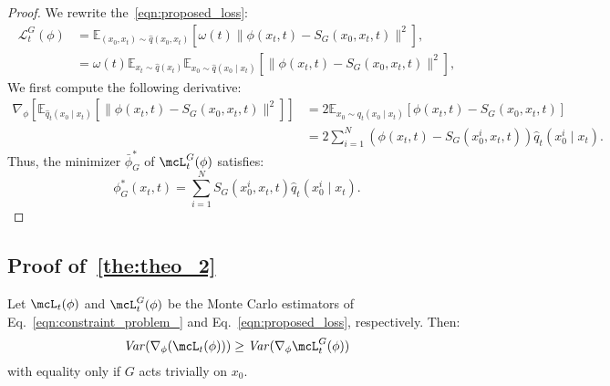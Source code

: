 \begin{proof}
We rewrite the~\cref{eqn:proposed_loss}:
\begin{align}
    \mathcal{L}^G_t(\phi) &= \mathbb{E}_{(x_0, x_t) \sim \hat{q}(x_0, x_t)} \left[ \omega(t) \| \phi(x_t, t) - S_G(x_0, x_t, t) \|^2 \right], \\
    &= \omega(t)\mathbb{E}_{x_t \sim \hat{q}(x_t)}\mathbb{E}_{x_0 \sim \hat{q}(x_0 \mid x_t)} \left[ \| \phi(x_t, t) - S_G(x_0, x_t, t) \|^2 \right],
\end{align}
We first compute the following derivative:
\begin{align}
    \nabla_\phi \left[ \mathbb{E}_{\hat{q}_t(x_0 \mid x_t)} \left[ \| \phi(x_t, t) - S_G(x_0, x_t, t) \|^2 \right] \right] &= 2 \mathbb{E}_{x_0 \sim \hat{q}_t(x_0 \mid x_t)} \left[\phi(x_t, t) - S_G(x_0, x_t, t)  \right] \\
    &= 2 \sum_{i=1}^N (\phi(x_t, t) - S_G(x_0^i, x_t, t)) \hat{q}_t(x_0^i \mid x_t).
\end{align}
Thus, the minimizer \( \bar{\phi}^*_G \) of \(\mcL_t^G(\phi)\) satisfies:
\begin{equation}
    \phi_G^*(x_t, t) = \sum_{i=1}^N S_G(x_0^i, x_t, t) \hat{q}_t(x_0^i \mid x_t). 
\end{equation}






\end{proof}


\subsection{Proof of~\cref{the:theo_2}}
\label{sub_app:theo_2}

\begin{tcolorbox}[title=Variance Reduction of the Proposed Loss]
\begin{theorem}
Let \(\mcL_t(\phi)\) and \(\mcL_t^G(\phi)\) be the Monte Carlo estimators of Eq.~\eqref{eqn:constraint_problem_} and Eq.~\eqref{eqn:proposed_loss}, respectively. Then:
\begin{equation}
    \text{\emph{Var}}(\nabla_\phi(\mcL_t(\phi))) \geq \text{\emph{Var}}(\nabla_\phi\mcL_t^G(\phi))
\end{equation}
with equality only if \(G\) acts trivially on \(x_0\).
\end{theorem}
\end{tcolorbox}


